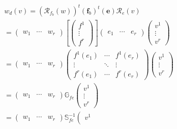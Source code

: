 \documentclass[aps,preprint]{revtex4}
\begin{document}
\begin{gather}
w_{d}\left( v\right) =\left( \mathcal{R}_{f_{b}}\left( w\right) \right)
^{t}\left( \boldsymbol{f}_{b}\right) ^{t}\left( \boldsymbol{e}\right) 
\mathcal{R}_{e}\left( v\right) \\
=\left( 
\begin{array}{ccc}
w_{1} & \cdots & w_{r}%
\end{array}%
\right) \left[ \left( 
\begin{array}{c}
f^{1} \\ 
\vdots \\ 
f^{r}%
\end{array}%
\right) \right] \left( 
\begin{array}{ccc}
e_{1} & \cdots & e_{r}%
\end{array}%
\right) \left( 
\begin{array}{c}
v^{1} \\ 
\vdots \\ 
v^{r}%
\end{array}%
\right) \\
=\left( 
\begin{array}{ccc}
w_{1} & \cdots & w_{r}%
\end{array}%
\right) \left( 
\begin{array}{ccc}
f^{1}\left( e_{1}\right) & \cdots & f^{1}\left( e_{r}\right) \\ 
\vdots & \ddots & \vdots \\ 
f^{r}\left( e_{1}\right) & \cdots & f^{r}\left( e_{r}\right)%
\end{array}%
\right) \left( 
\begin{array}{c}
v^{1} \\ 
\vdots \\ 
v^{r}%
\end{array}%
\right) \\
=\left( 
\begin{array}{ccc}
w_{1} & \cdots & w_{r}%
\end{array}%
\right) \mathbb{G}_{fe}\left( 
\begin{array}{c}
v^{1} \\ 
\vdots \\ 
v^{r}%
\end{array}%
\right) \\
=\left( 
\begin{array}{ccc}
w_{1} & \cdots & w_{r}%
\end{array}%
\right) \mathbb{S}_{fe}^{-1}\left( 
\begin{array}{c}
v^{1} \\ 

\end{array}
\end{gather}
\end{document}
